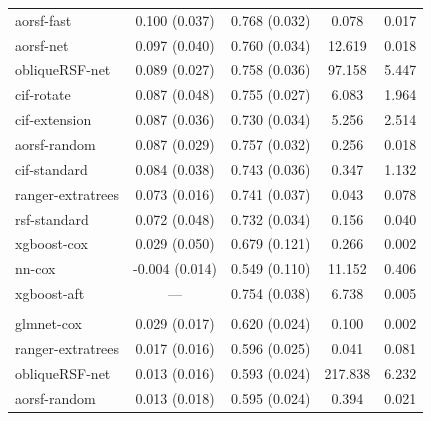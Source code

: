 \documentclass{article}\usepackage[]{graphicx}\usepackage[]{xcolor}
\newenvironment{knitrout}{}{} %
\begin{document}
\begin{knitrout}
\begin{longtable}[t]{lcccc}
\hspace{1em}aorsf-fast & 0.100 (0.037) & 0.768 (0.032) & 0.078 & 0.017\\
\hspace{1em}aorsf-net & 0.097 (0.040) & 0.760 (0.034) & 12.619 & 0.018\\
\hspace{1em}obliqueRSF-net & 0.089 (0.027) & 0.758 (0.036) & 97.158 & 5.447\\
\hspace{1em}cif-rotate & 0.087 (0.048) & 0.755 (0.027) & 6.083 & 1.964\\
\hspace{1em}cif-extension & 0.087 (0.036) & 0.730 (0.034) & 5.256 & 2.514\\
\hspace{1em}aorsf-random & 0.087 (0.029) & 0.757 (0.032) & 0.256 & 0.018\\
\hspace{1em}cif-standard & 0.084 (0.038) & 0.743 (0.036) & 0.347 & 1.132\\
\hspace{1em}ranger-extratrees & 0.073 (0.016) & 0.741 (0.037) & 0.043 & 0.078\\
\hspace{1em}rsf-standard & 0.072 (0.048) & 0.732 (0.034) & 0.156 & 0.040\\
\hspace{1em}xgboost-cox & 0.029 (0.050) & 0.679 (0.121) & 0.266 & 0.002\\
\hspace{1em}nn-cox & -0.004 (0.014) & 0.549 (0.110) & 11.152 & 0.406\\
\hspace{1em}xgboost-aft & --- & 0.754 (0.038) & 6.738 & 0.005\\
\addlinespace[0.3em]
\multicolumn{5}{l}{\textit{\textbf{FCL; relapse, n = 541, p = 7}}}\\
\hline
\hspace{1em}glmnet-cox & 0.029 (0.017) & 0.620 (0.024) & 0.100 & 0.002\\
\hspace{1em}ranger-extratrees & 0.017 (0.016) & 0.596 (0.025) & 0.041 & 0.081\\
\hspace{1em}obliqueRSF-net & 0.013 (0.016) & 0.593 (0.024) & 217.838 & 6.232\\
\hspace{1em}aorsf-random & 0.013 (0.018) & 0.595 (0.024) & 0.394 & 0.021\\

\end{longtable}
\end{knitrout}
\end{document}
